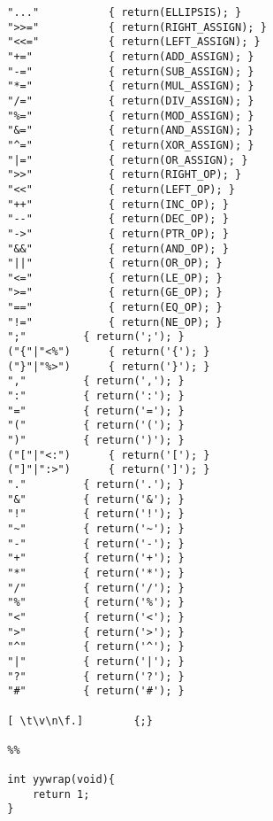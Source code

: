 \documentclass{article}
\begin{document}
\begin{lstlisting}
		"..."			{ return(ELLIPSIS); }
		">>="			{ return(RIGHT_ASSIGN); }
		"<<="			{ return(LEFT_ASSIGN); }
		"+="			{ return(ADD_ASSIGN); }
		"-="			{ return(SUB_ASSIGN); }
		"*="			{ return(MUL_ASSIGN); }
		"/="			{ return(DIV_ASSIGN); }
		"%="			{ return(MOD_ASSIGN); }
		"&="			{ return(AND_ASSIGN); }
		"^="			{ return(XOR_ASSIGN); }
		"|="			{ return(OR_ASSIGN); }
		">>"			{ return(RIGHT_OP); }
		"<<"			{ return(LEFT_OP); }
		"++"			{ return(INC_OP); }
		"--"			{ return(DEC_OP); }
		"->"			{ return(PTR_OP); }
		"&&"			{ return(AND_OP); }
		"||"			{ return(OR_OP); }
		"<="			{ return(LE_OP); }
		">="			{ return(GE_OP); }
		"=="			{ return(EQ_OP); }
		"!="			{ return(NE_OP); }
		";"			{ return(';'); }
		("{"|"<%")		{ return('{'); }
		("}"|"%>")		{ return('}'); }
		","			{ return(','); }
		":"			{ return(':'); }
		"="			{ return('='); }
		"("			{ return('('); }
		")"			{ return(')'); }
		("["|"<:")		{ return('['); }
		("]"|":>")		{ return(']'); }
		"."			{ return('.'); }
		"&"			{ return('&'); }
		"!"			{ return('!'); }
		"~"			{ return('~'); }
		"-"			{ return('-'); }
		"+"			{ return('+'); }
		"*"			{ return('*'); }
		"/"			{ return('/'); }
		"%"			{ return('%'); }
		"<"			{ return('<'); }
		">"			{ return('>'); }
		"^"			{ return('^'); }
		"|"			{ return('|'); }
		"?"			{ return('?'); }
		"#"			{ return('#'); }
		
		[ \t\v\n\f.]		{;}
		
		%%
		
		int yywrap(void){
			return 1;
		}
\end{lstlisting}

\newpage
\end{document}

